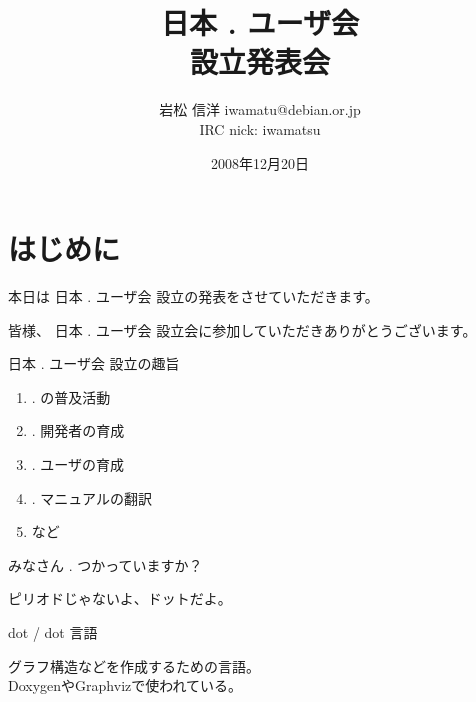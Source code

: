 \documentclass[cjk,dvipdfmx,20pt]{beamer}
\title{日本 . ユーザ会\\設立発表会}
\author{岩松 信洋 iwamatu@debian.or.jp\\IRC nick: iwamatsu}
\date{2008年12月20日}
\begin{document}
\frame{\titlepage{}}


\section{はじめに}

\begin{frame}{}
\begin{center}
本日は 日本 . ユーザ会 設立の発表をさせていただきます。
\end{center}
\end{frame}

\begin{frame}{}
\begin{center}
皆様、 日本 . ユーザ会 設立会に参加していただきありがとうございます。
\end{center}
\end{frame}

\begin{frame}{}
\begin{center}
日本 . ユーザ会 設立の趣旨
\end{center}
\begin{enumerate}
\item . の普及活動
\item . 開発者の育成
\item . ユーザの育成
\item . マニュアルの翻訳
\item など
\end{enumerate}

\end{frame}

\begin{frame}{}
\begin{center}
みなさん . つかっていますか？
\end{center}
\end{frame}

\begin{frame}{}
\begin{center}
ピリオドじゃないよ、ドットだよ。
\end{center}
\end{frame}

\begin{frame}{}
\begin{center}
dot / dot 言語
\end{center}
\end{frame}

\begin{frame}{}
\begin{center}
  グラフ構造などを作成するための言語。\\
DoxygenやGraphvizで使われている。
\end{center}
\end{frame}
\end{document}
